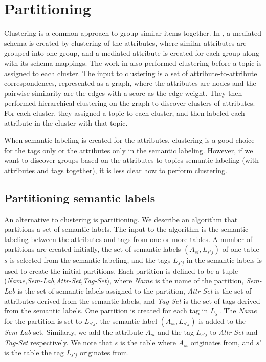 \section{Partitioning}
\label{sec:Partitioning}

Clustering is a common approach to group similar items together. In \cite{ilprints851}, a mediated schema is created by clustering of the attributes, where similar attributes are grouped into one group, and a mediated attribute is created for each group along with its schema mappings. The work in \cite{Smith2011Unity} also performed clustering before a topic is assigned to each cluster. The input to clustering is a set of attribute-to-attribute correspondences, represented as a graph, where the attributes are nodes and the pairwise similarity are the edges with a score as the edge weight. They then performed hierarchical clustering on the graph to discover clusters of attributes. For each cluster, they assigned a topic to each cluster, and then labeled each attribute in the cluster with that topic.

When semantic labeling is created for the attributes, clustering is a good choice for the tags only or the attributes only in the semantic labeling. However, if we want to discover groups based on the attributes-to-topics semantic labeling (with attributes and tags together), it is less clear how to perform clustering.

\subsection{Partitioning semantic labels}
\label{ssec:PartitioningSemanticLabels}

An alternative to clustering is partitioning. We describe an algorithm that partitions a set of semantic labels. The input to the algorithm is the semantic labeling between the attributes and tags from one or more tables. A number of partitions are created initially, the set of semantic labels $(A_{si},L_{s'j})$ of one table $s$ is selected from the semantic labeling, and the tags $L_{s'j}$ in the semantic labels is used to create the initial partitions. Each partition is defined to be a tuple (\textit{Name},\textit{Sem-Lab},\textit{Attr-Set},\textit{Tag-Set}), where \textit{Name} is the name of the partition, \textit{Sem-Lab} is the set of semantic labels assigned to the partition, \textit{Attr-Set} is the set of attributes derived from the semantic labels, and \textit{Tag-Set} is the set of tags derived from the semantic labels. One partition is created for each tag in $L_{s'}$. The \textit{Name} for the partition is set to $L_{s'j}$, the semantic label $(A_{si},L_{s'j})$ is added to the \textit{Sem-Lab} set. Similarly, we add the attribute $A_{si}$ and the tag $L_{s'j}$ to \textit{Attr-Set} and \textit{Tag-Set} respectively. We note that $s$ is the table where $A_{si}$ originates from, and $s'$ is the table the tag $L_{s'j}$ originates from.

